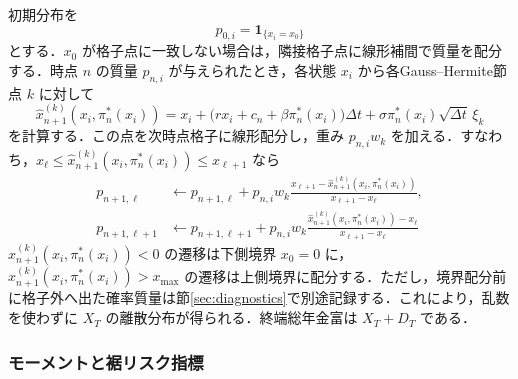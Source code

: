 \documentclass[10pt,a4paper]{article}
\theoremstyle{plain}
\theoremstyle{definition}
\newcommand{\one}{\mathbf{1}}
\begin{document}
初期分布を
\begin{equation}
  p_{0,i}=\one_{\{x_i=x_0\}}
  \label{eq:initial-mass}
\end{equation}
とする．$x_0$ が格子点に一致しない場合は，隣接格子点に線形補間で質量を配分する．時点 $n$ の質量 $p_{n,i}$ が与えられたとき，各状態 $x_i$ から各Gauss--Hermite節点 $k$ に対して
\begin{equation}
  \widehat{x}_{n+1}^{(k)}(x_i,\pi_n^*(x_i))
  =x_i+\bigl(rx_i+c_n+\beta\pi_n^*(x_i)\bigr)\Delta t
  +\sigma\pi_n^*(x_i)\sqrt{\Delta t}\,\xi_k
  \label{eq:forward-node}
\end{equation}
を計算する．この点を次時点格子に線形配分し，重み $p_{n,i}w_k$ を加える．すなわち，$x_{\ell}\leq \widehat{x}_{n+1}^{(k)}(x_i,\pi_n^*(x_i))\leq x_{\ell+1}$ なら
\begin{align}
  p_{n+1,\ell}&\leftarrow p_{n+1,\ell}
  +p_{n,i}w_k\frac{x_{\ell+1}-\widehat{x}_{n+1}^{(k)}(x_i,\pi_n^*(x_i))}{x_{\ell+1}-x_{\ell}},\label{eq:mass-left}\\
  p_{n+1,\ell+1}&\leftarrow p_{n+1,\ell+1}
  +p_{n,i}w_k\frac{\widehat{x}_{n+1}^{(k)}(x_i,\pi_n^*(x_i))-x_{\ell}}{x_{\ell+1}-x_{\ell}}
  \label{eq:mass-right}
\end{align}
$\widehat{x}_{n+1}^{(k)}(x_i,\pi_n^*(x_i))<0$ の遷移は下側境界 $x_0=0$ に，$\widehat{x}_{n+1}^{(k)}(x_i,\pi_n^*(x_i))>x_{\max}$ の遷移は上側境界に配分する．ただし，境界配分前に格子外へ出た確率質量は節\ref{sec:diagnostics}で別途記録する．これにより，乱数を使わずに $X_T$ の離散分布が得られる．終端総年金富は $X_T+D_T$ である．

\subsubsection{モーメントと裾リスク指標}
\end{document}
